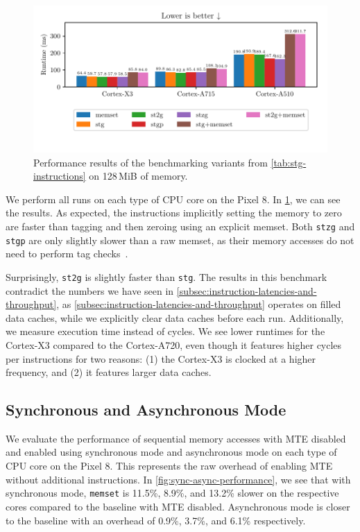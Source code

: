\begin{figure}[h]
    \centering
    \includegraphics{plots/stg}
    \caption{Performance results of the benchmarking variants from \cref{tab:stg-instructions} on 128\,MiB of memory.}
    \label{fig:stg-performance}
\end{figure}

We perform all runs on each type of CPU core on the Pixel 8.
In \cref{fig:stg-performance}, we can see the results.
As expected, the instructions implicitly setting the memory to zero are faster than tagging and then zeroing using an explicit memset.
Both \texttt{stzg} and \texttt{stgp} are only slightly slower than a raw memset, as their memory accesses do not need to perform tag checks~\cite{ARMA2024Arch64}.

Surprisingly, \texttt{st2g} is slightly faster than \texttt{stg}.
The results in this benchmark contradict the numbers we have seen in \cref{subsec:instruction-latencies-and-throughput}, as \cref{subsec:instruction-latencies-and-throughput} operates on filled data caches, while we explicitly clear data caches before each run.
Additionally, we measure execution time instead of cycles.
We see lower runtimes for the Cortex-X3 compared to the Cortex-A720, even though it features higher cycles per instructions for two reasons: (1) the Cortex-X3 is clocked at a higher frequency, and (2) it features larger data caches.

\subsection{Synchronous and Asynchronous Mode}
\label{subsec:synchronous-and-asynchronous-mode}

We evaluate the performance of sequential memory accesses with \ac{MTE} disabled and enabled using synchronous mode and asynchronous mode on each type of CPU core on the Pixel 8.
This represents the raw overhead of enabling \ac{MTE} without additional instructions.
In \cref{fig:sync-async-performance}, we see that with synchronous mode, \texttt{memset} is 11.5\%, 8.9\%, and 13.2\% slower on the respective cores compared to the baseline with \ac{MTE} disabled.
Asynchronous mode is closer to the baseline with an overhead of 0.9\%, 3.7\%, and 6.1\% respectively.

